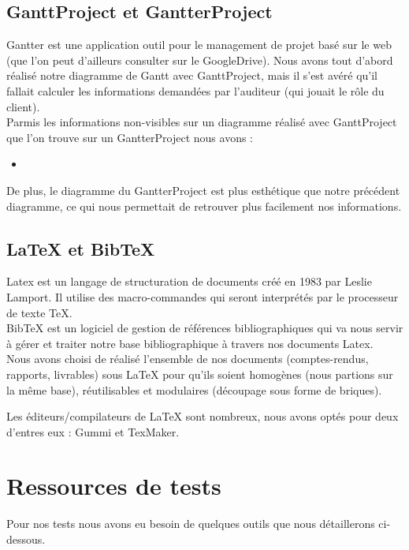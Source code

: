 \subsection{GanttProject et GantterProject}

Gantter \cite{gantter} est une application outil pour le management de projet basé sur le web (que l'on peut d'ailleurs consulter sur le GoogleDrive).
Nous avons tout d'abord réalisé notre diagramme de Gantt avec GanttProject, mais il s'est avéré qu'il fallait calculer les informations demandées par l'auditeur (qui jouait le rôle du client).\\
Parmis les informations non-visibles sur un diagramme réalisé avec GanttProject que l'on trouve sur un GantterProject nous avons :
\begin{itemize}
\item
\end{itemize}

De plus, le diagramme du GantterProject est plus esthétique que notre précédent diagramme, ce qui nous permettait de retrouver plus facilement nos informations.

\subsection{LaTeX et BibTeX}

Latex est un langage de structuration de documents créé en 1983 par Leslie Lamport. Il utilise des macro-commandes qui seront interprétés par le processeur de texte TeX.\\
BibTeX est un logiciel de gestion de références bibliographiques qui va nous servir à gérer et traiter notre base bibliographique à travers nos documents Latex.\\

Nous avons choisi de réalisé l'ensemble de nos documents (comptes-rendus, rapports, livrables) sous LaTeX pour qu'ils soient homogènes (nous partions sur la même base), réutilisables et modulaires (découpage sous forme de briques).

Les éditeurs/compilateurs de LaTeX sont nombreux, nous avons optés pour deux d'entres eux : Gummi et TexMaker.

\section{Ressources de tests}

Pour nos tests nous avons eu besoin de quelques outils que nous détaillerons ci-dessous.

